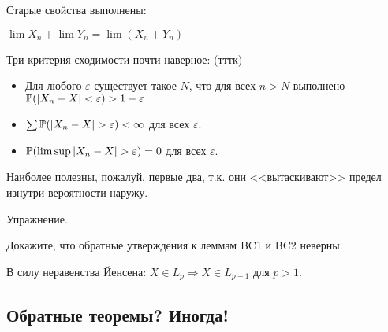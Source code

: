 {Старые свойства выполнены: \par
$\lim X_{n}+\lim Y_{n}=\lim (X_{n}+Y_{n})$ \par




Три критерия сходимости почти наверное: (тттк)
\begin{itemize}
\item Для любого $\varepsilon$ существует такое $N$, что для всех $n>N$ выполнено $\P(|X_{n}-X|<\varepsilon)>1-\varepsilon$
\item $\sum \P(|X_{n}-X|>\varepsilon)<\infty$ для всех $\varepsilon$.
\item $\P(\limsup |X_{n}-X|>\varepsilon)=0$ для всех $\varepsilon$.
\end{itemize}
Наиболее полезны, пожалуй, первые два, т.к. они <<вытаскивают>> предел изнутри вероятности наружу.





Упражнение. \par
Докажите, что обратные утверждения к леммам BC1 и BC2 неверны. \par

В силу неравенства Йенсена: $X \in L_{p} \Rightarrow X \in
L_{p-1}$ для $p>1$. \par



}\subsection{Обратные теоремы? Иногда!} 
